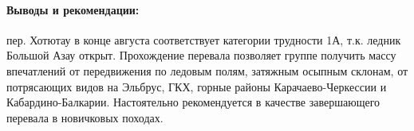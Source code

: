 \paragraph{Выводы и рекомендации:} пер. Хотютау в конце августа соответствует категории трудности 1А, т.к. ледник Большой Азау открыт. Прохождение перевала позволяет группе получить массу впечатлений от передвижения по ледовым полям, затяжным осыпным склонам, от потрясающих видов на Эльбрус, ГКХ, горные районы Карачаево-Черкессии и Кабардино-Балкарии. Настоятельно рекомендуется в качестве завершающего перевала в новичковых походах.


\clearpage